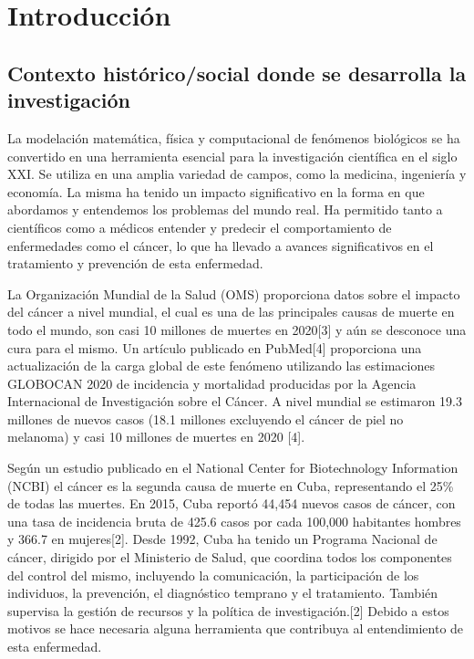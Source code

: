 \chapter*{Introducción}\label{chapter:introduction}

\section{Contexto hist\'orico/social donde se desarrolla la investigaci\'on}
\hspace{.1cm}La modelación matemática, física y computacional de fenómenos biológicos se ha convertido en una herramienta esencial para la investigación científica en el siglo XXI. Se utiliza en una amplia variedad de campos, como la medicina, ingeniería y economía. La misma ha tenido un impacto significativo en la forma en que abordamos y entendemos los problemas del mundo real. Ha permitido tanto a científicos como a médicos entender y predecir el comportamiento de enfermedades como el cáncer, lo que ha llevado a avances significativos en el tratamiento y prevención de esta enfermedad.

\hspace{.1cm}La Organización Mundial de la Salud (OMS) proporciona datos sobre el impacto del cáncer a nivel mundial, el cual es una de las principales causas de muerte en todo el mundo, son casi 10 millones de muertes en 2020[3] y aún se desconoce una cura para el mismo. Un artículo publicado en PubMed[4] proporciona una actualización de la carga global de este fen\'omeno utilizando las estimaciones GLOBOCAN 2020 de incidencia y mortalidad producidas por la Agencia Internacional de Investigación sobre el Cáncer. A nivel mundial se estimaron 19.3 millones de nuevos casos (18.1 millones excluyendo el cáncer de piel no melanoma) y casi 10 millones de muertes en 2020 [4].

\hspace{.1cm}Según un estudio publicado en el National Center for Biotechnology Information (NCBI) el cáncer es la segunda causa de muerte en Cuba, representando el 25\% de todas las muertes. En 2015, Cuba reportó 44,454 nuevos casos de cáncer, con una tasa de incidencia bruta de 425.6 casos por cada 100,000 habitantes hombres y 366.7 en mujeres[2]. Desde 1992, Cuba ha tenido un Programa Nacional de cáncer, dirigido por el Ministerio de Salud, que coordina todos los componentes del control del mismo, incluyendo la comunicación, la participación de los individuos, la prevención, el diagnóstico temprano y el tratamiento. También supervisa la gestión de recursos y la política de investigación.[2] Debido a estos motivos se hace necesaria alguna herramienta que contribuya al entendimiento de esta enfermedad.

